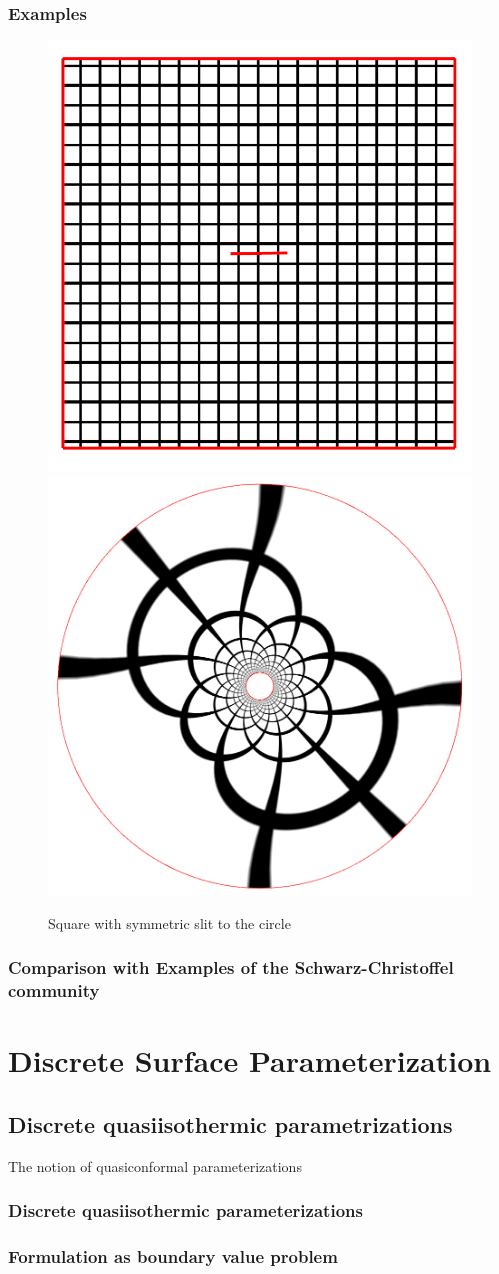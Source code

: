 \documentclass{book}
\begin{document}
\subsection{Examples}
\begin{figure}
	\centering
	\includegraphics[width=0.3\linewidth]{image/slit_domain/domain_grid.png}
	\includegraphics[width=0.3\linewidth]{image/slit_domain/image_grid.png}
	\caption{Square with symmetric slit to the circle}
	\label{fig:slit_circle}
\end{figure}

\subsection{Comparison with Examples of the Schwarz-Christoffel community}

\chapter{Discrete Surface Parameterization}


\section{Discrete quasiisothermic parametrizations}
The notion of quasiconformal parameterizations

\subsection{Discrete quasiisothermic parameterizations}

\subsection{Formulation as boundary value problem}
\end{document}
